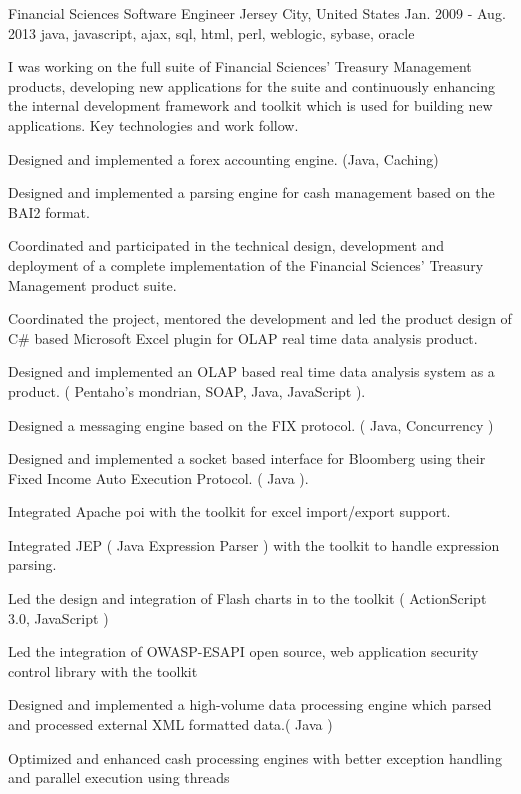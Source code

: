 \cventry
    {Financial Sciences} %
    {Software Engineer} %
    {Jersey City, United States} %
    {Jan. 2009 - Aug. 2013} %
    { java, javascript, ajax, sql, html, perl, weblogic, sybase, oracle } %
    {
        I was working on the full suite of Financial Sciences' Treasury Management products, developing new applications for the suite and continuously enhancing the
        internal development framework and toolkit which is used for building new applications. Key technologies and work follow.
    \begin{cvitems} %
        \item { Designed and implemented a forex accounting engine. (Java, Caching)}
        \item { Designed and implemented a parsing engine for cash management based on the BAI2 format.}
        \item { Coordinated and participated in the technical design, development and deployment of a complete implementation of the Financial Sciences' Treasury Management product suite.}
        \item { Coordinated the project, mentored the development and led the product design of C\# based Microsoft Excel plugin for OLAP real time data analysis product.}
        \item { Designed and implemented an OLAP based real time data analysis system as a product. ( Pentaho's mondrian, SOAP, Java, JavaScript ).}
        \item { Designed a messaging engine based on the FIX protocol. ( Java, Concurrency )}
        \item { Designed and implemented a socket based interface for Bloomberg using their Fixed Income Auto Execution Protocol. ( Java ).}
        \item { Integrated Apache poi with the toolkit for excel import/export support.}
        \item { Integrated JEP ( Java Expression Parser ) with the toolkit to handle expression parsing.}
        \item { Led the design and integration of Flash charts in to the toolkit ( ActionScript 3.0, JavaScript )}
        \item { Led the integration of OWASP-ESAPI open source, web application security control library with the toolkit}
        \item { Designed and implemented a high-volume data processing engine which parsed and processed external XML formatted data.( Java )}
        \item { Optimized and enhanced cash processing engines with better exception handling and parallel execution using threads }
    \end{cvitems}
    }